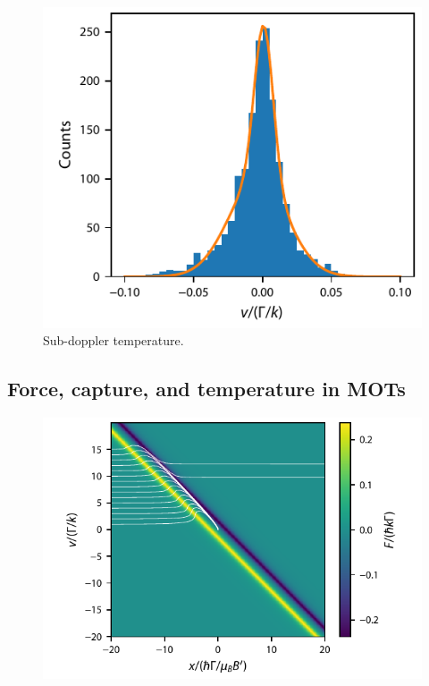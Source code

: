 \documentclass[final,5p,times,twocolumn]{elsarticle}
\begin{document}
\begin{figure}
	\center
	\includegraphics{figs/temperature_histogram_F2_to_F3}
	\caption{\label{fig:sub_doppler_temperature} Sub-doppler temperature.}
\end{figure}

\subsection{Force, capture, and temperature in MOTs}

\begin{figure}
	\center
	\includegraphics{figs/F0_to_F1_MOT_force_with_incoming_trajectories.pdf}
	\caption{\label{fig:mot_forces}}
\end{figure}
\end{document}
